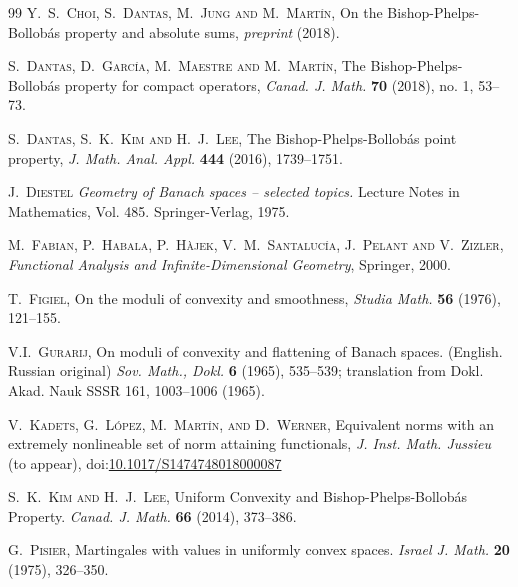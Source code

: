 \documentclass[a4paper,10pt]{amsart}
\theoremstyle{plain}
\theoremstyle{definition}
\begin{document}
\begin{thebibliography}{99}
 \textsc{Y.~S.~Choi, S.~Dantas, M.~Jung and M.~Mart\'in}, On the Bishop-Phelps-Bollob\'as property and absolute sums, \emph{preprint} (2018).


 \textsc{S.~Dantas, D.~Garc\'ia, M.~Maestre and M.~Mart\'in}, The Bishop-Phelps-Bollob\'as property for compact operators, \emph{Canad. J. Math.} \textbf{70} (2018), no. 1, 53--73.

 \textsc{S.~Dantas, S.~K.~Kim and H.~J.~Lee}, The Bishop-Phelps-Bollob\'as point property, \emph{J. Math. Anal. Appl.} \textbf{444} (2016), 1739--1751.

 \textsc{J.~Diestel} \emph{Geometry of Banach spaces -- selected topics.} Lecture Notes in Mathematics, Vol. 485. Springer-Verlag, 1975.

 \textsc{M.~Fabian, P.~Habala, P.~H\`ajek, V.~M.~Santaluc\'ia, J.~Pelant and V.~Zizler}, \emph{Functional Analysis and Infinite-Dimensional Geometry}, Springer, 2000.

 \textsc{T.~Figiel}, On the moduli of convexity and smoothness,  \emph{Studia Math.} \textbf{56} (1976), 121--155.


  \textsc{V.I.~Gurarij}, On moduli of convexity and flattening of Banach spaces. (English. Russian original) \emph{Sov. Math., Dokl.} \textbf{6} (1965), 535--539; translation from Dokl. Akad. Nauk SSSR 161, 1003--1006 (1965).


 \textsc{V.~Kadets, G.~L\'opez, M.~Mart\'{\i}n,  and D.~Werner},  Equivalent norms with an extremely nonlineable set of norm attaining functionals, \emph{J. Inst. Math. Jussieu} (to appear), doi:\href{https://doi.org/10.1017/S1474748018000087}{10.1017/S1474748018000087}

  \textsc{S.~K.~Kim and H.~J.~Lee}, Uniform Convexity and Bishop-Phelps-Bollob\'as Property. \emph{Canad. J. Math.} {\bf 66} (2014),  373--386.

 \textsc{G.~Pisier}, Martingales with values in uniformly convex spaces. \emph{Israel J. Math.} \textbf{20} (1975), 326--350.

\end{thebibliography}

\newpage
\end{document}
